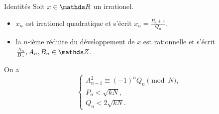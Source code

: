 \begin{frame}{Identités}
Soit $x\in \R$ un irrationel.
\begin{itemize}
	\item $x_n$ est irrationel quadratique et s'écrit $x_n = \frac{P_n +
	x}{Q_n}$,
	\item la $n$-ième réduite du développement de $x$ est rationnelle et
	s'écrit $\frac{A_n}{B_n}, A_n, B_n \in \Z$.
\end{itemize}

\pause
\vspace{1em}

On a
\[\begin{cases}
	A_{n-1}^2 \equiv (-1)^n Q_n \pmod{N}, \\
	P_n < \sqrt{kN}, \\
	Q_n < 2\sqrt{kN}.
\end{cases}\]

\end{frame}
